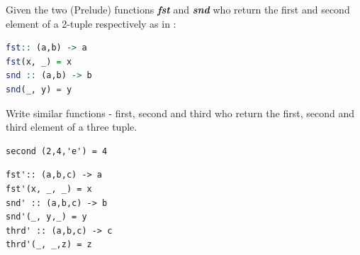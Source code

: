 \documentclass{article}
\begin{document}
\pagebreak
\begin{Exercise}
 Given the two (Prelude) functions \textbf{\textit{fst}} and \textbf{\textit{snd}} who return the first and second element of a 2-tuple respectively as in : 
\begin{lstlisting}[language=Haskell]
fst:: (a,b) -> a
fst(x, _) = x
snd :: (a,b) -> b
snd(_, y) = y
\end{lstlisting}
Write similar functions  - first, second and third who return the first, second and third element of a three tuple. 
\begin{lstlisting}
second (2,4,'e') = 4
\end{lstlisting}
\end{Exercise}
\begin{Answer}
\begin{lstlisting}
fst':: (a,b,c) -> a
fst'(x, _, _) = x
snd' :: (a,b,c) -> b
snd'(_, y,_) = y
thrd' :: (a,b,c) -> c
thrd'(_, _,z) = z
\end{lstlisting}
\end{Answer}
\pagebreak
{}
\end{document}
